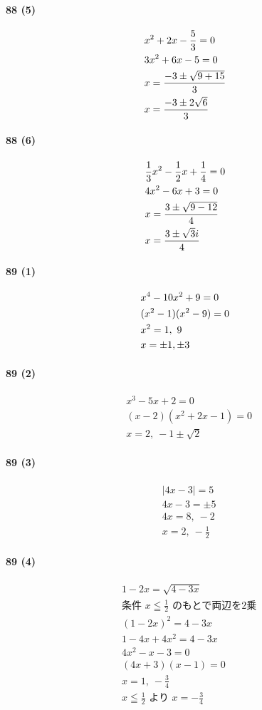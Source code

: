 \documentclass[fleqn,a4j,dvipdfmx,uplatex,twocolumn]{jsarticle}
\def\nr{\notag\\}%
\begin{document}
\paragraph{88 (5)}
\begin{align*}
  &x^2 + 2x - \frac{5}{3} = 0 \nr
  &3x^2 + 6x - 5 = 0 \nr
  &x = \frac{-3 \pm \sqrt{9 + 15}}{3} \nr
  &x = \frac{-3 \pm 2\sqrt{6}}{3}
\end{align*}

\paragraph{88 (6)}
\begin{align*}
  &\frac{1}{3}x^2 - \frac{1}{2}x + \frac{1}{4} = 0 \nr
  &4x^2 - 6x + 3 = 0 \nr
  &x = \frac{3 \pm \sqrt{9 - 12}}{4} \nr
  &x = \frac{3 \pm \sqrt{3}i}{4}
\end{align*}

\paragraph{89 (1)}
\begin{align*}
  &x^4 - 10x^2 + 9 = 0 \nr
  &(x^2 - 1)(x^2 - 9) = 0 \nr
  &x^2 = 1, \ 9 \nr
  &x = \pm 1, \pm 3
\end{align*}

\paragraph{89 (2)}
\begin{align*}
  &x^{3}-5x+2=0 \\
  &(x-2)(x^{2}+2x-1)=0 \\
  &x=2, \ -1 \pm \sqrt{2}
\end{align*}

\paragraph{89 (3)}
\begin{align*}
  &|4 x-3|=5 \\
  &4 x-3=\pm 5 \\
  &4 x=8, \ -2 \\
  &x=2, \ -\frac{1}{2}
\end{align*}

\paragraph{89 (4)}
\begin{align*}
  &1-2 x=\sqrt{4-3 x} \\
  &\text{条件 } x \leqq \frac{1}{2} \text{ のもとで両辺を2乗} \\
  &(1-2 x)^{2}=4-3 x \\
  &1-4 x+4 x^{2}=4-3 x \\
  &4 x^{2}-x-3=0 \\
  &(4 x+3)(x-1)=0 \\
  &x=1, \ -\frac{3}{4} \\
  &x \leqq \frac{1}{2} \text{ より } x=-\frac{3}{4}
\end{align*}
\end{document}
